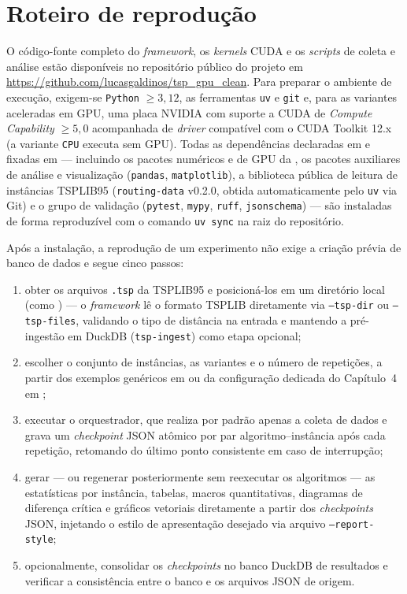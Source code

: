 \section{Roteiro de reprodução}\label{apendice-reproducao}

O código-fonte completo do \emph{framework}, os \emph{kernels} CUDA e os \emph{scripts} de coleta e análise estão disponíveis no repositório público do projeto em \url{https://github.com/lucasgaldinos/tsp_gpu_clean}.
Para preparar o ambiente de execução, exigem-se \texttt{Python} \(\ge 3{,}12\), as ferramentas \texttt{uv} e \texttt{git} e, para as variantes aceleradas em GPU, uma placa NVIDIA com suporte a CUDA de \emph{Compute Capability} \(\ge 5{,}0\) acompanhada de \emph{driver} compatível com o CUDA Toolkit 12.x (a variante \texttt{CPU} executa sem GPU).
Todas as dependências declaradas em  e fixadas em  --- incluindo os pacotes numéricos e de GPU da , os pacotes auxiliares de análise e visualização (\texttt{pandas}, \texttt{matplotlib}), a biblioteca pública de leitura de instâncias TSPLIB95 (\texttt{routing-data} v0.2.0, obtida automaticamente pelo \texttt{uv} via Git) e o grupo de validação (\texttt{pytest}, \texttt{mypy}, \texttt{ruff}, \texttt{jsonschema}) --- são instaladas de forma reproduzível com o comando \texttt{uv sync} na raiz do repositório.

Após a instalação, a reprodução de um experimento não exige a criação prévia de banco de dados e segue cinco passos:

\begin{enumerate}
  \item
        obter os arquivos \texttt{.tsp} da TSPLIB95 e posicioná-los em um diretório local (como ) --- o \emph{framework} lê o formato TSPLIB diretamente via \texttt{--tsp-dir} ou \texttt{--tsp-files}, validando o tipo de distância na entrada e mantendo a pré-ingestão em DuckDB (\texttt{tsp-ingest}) como etapa opcional;
  \item
        escolher o conjunto de instâncias, as variantes e o número de repetições, a partir dos exemplos genéricos em  ou da configuração dedicada do Capítulo~4 em ;
  \item
        executar o orquestrador, que realiza por padrão apenas a coleta de dados e grava um \emph{checkpoint} JSON atômico por par algoritmo--instância após cada repetição, retomando do último ponto consistente em caso de interrupção;
  \item
        gerar --- ou regenerar posteriormente sem reexecutar os algoritmos --- as estatísticas por instância, tabelas, macros quantitativas, diagramas de diferença crítica e gráficos vetoriais diretamente a partir dos \emph{checkpoints} JSON, injetando o estilo de apresentação desejado via arquivo \texttt{--report-style};
  \item
        opcionalmente, consolidar os \emph{checkpoints} no banco DuckDB de resultados e verificar a consistência entre o banco e os arquivos JSON de origem.
\end{enumerate}

